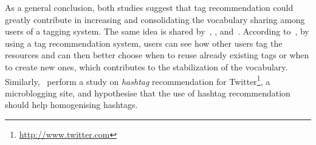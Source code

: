As a general conclusion, both studies suggest that tag recommendation could greatly contribute in increasing and consolidating the vocabulary sharing among users of a tagging system. The same idea is shared by~\cite{golder2006}, \cite{jaske2007}, and~\cite{Sood2007}. According to~\cite{Sood2007}, by using a tag recommendation system, users can see how other users tag the resources and can then better choose when to reuse already existing tags or when to create new ones, which contributes to the stabilization of the vocabulary. Similarly,~\cite{Zangerle2011} perform a study on \emph{hashtag} recommendation for Twitter\footnote{\url{http://www.twitter.com}}, a microblogging site, and hypothesise that the use of hashtag recommendation should help homogenising hashtags.

